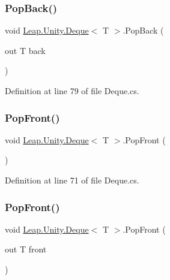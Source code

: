 \subsubsection{\texorpdfstring{PopBack()}{PopBack()}\hspace{0.1cm}{\footnotesize\ttfamily [2/2]}}
{\footnotesize\ttfamily void \mbox{\hyperlink{class_leap_1_1_unity_1_1_deque}{Leap.\+Unity.\+Deque}}$<$ T $>$.Pop\+Back (\begin{DoxyParamCaption}\item[{out T}]{back }\end{DoxyParamCaption})}



Definition at line 79 of file Deque.\+cs.

\mbox{\label{class_leap_1_1_unity_1_1_deque_a3a469f3d2a550481a770ab90824c2ab5}} 
\subsubsection{\texorpdfstring{PopFront()}{PopFront()}\hspace{0.1cm}{\footnotesize\ttfamily [1/2]}}
{\footnotesize\ttfamily void \mbox{\hyperlink{class_leap_1_1_unity_1_1_deque}{Leap.\+Unity.\+Deque}}$<$ T $>$.Pop\+Front (\begin{DoxyParamCaption}{ }\end{DoxyParamCaption})}



Definition at line 71 of file Deque.\+cs.

\mbox{\label{class_leap_1_1_unity_1_1_deque_a5074f34c072124f745e57c6440a51a4c}} 
\subsubsection{\texorpdfstring{PopFront()}{PopFront()}\hspace{0.1cm}{\footnotesize\ttfamily [2/2]}}
{\footnotesize\ttfamily void \mbox{\hyperlink{class_leap_1_1_unity_1_1_deque}{Leap.\+Unity.\+Deque}}$<$ T $>$.Pop\+Front (\begin{DoxyParamCaption}\item[{out T}]{front }\end{DoxyParamCaption})}



